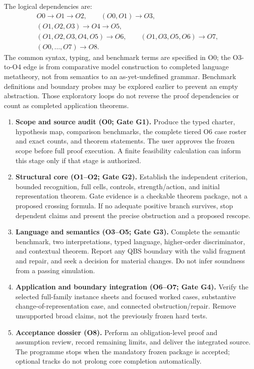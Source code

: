 \documentclass[11pt,a4paper]{article}
\begin{document}
The logical dependencies are:
\[
 \begin{gathered}
 O0\longrightarrow O1\longrightarrow O2,\qquad
 (O0,O1)\longrightarrow O3,\\
 (O1,O2,O3)\longrightarrow O4\longrightarrow O5,\\
 (O1,O2,O3,O4,O5)\longrightarrow O6,\qquad
 (O1,O3,O5,O6)\longrightarrow O7,\\
 (O0,\ldots,O7)\longrightarrow O8.
 \end{gathered}
\]
The common syntax, typing, and benchmark terms are specified in O0; the
O3-to-O4 edge is from comparative model construction to completed language
metatheory, not from semantics to an as-yet-undefined grammar.
Benchmark definitions and boundary probes may be explored earlier to prevent
an empty abstraction. Those exploratory loops do not reverse the proof
dependencies or count as completed application theorems.

\begin{enumerate}[label=\textbf{Stage \arabic*.}]
\item \textbf{Scope and source audit (O0; Gate G1).}
Produce the typed charter, hypothesis map, comparison benchmarks, the complete
tiered O6 case roster and exact counts, and theorem statements. The user
approves the frozen scope before
full proof execution. A finite feasibility calculation can inform this
stage only if that stage is authorized.
\item \textbf{Structural core (O1--O2; Gate G2).}
Establish the independent criterion, bounded recognition, full cells,
controls, strength/action, and initial representation theorem. Gate evidence
is a checkable theorem package, not a proposed crossing formula. If no
adequate positive branch survives, stop dependent claims and present the
precise obstruction and a proposed rescope.
\item \textbf{Language and semantics (O3--O5; Gate G3).}
Complete the semantic benchmark, two interpretations, typed language,
higher-order discriminator, and contextual theorem. Report any QBS boundary
with the valid fragment and repair, and seek a decision for material changes.
Do not infer soundness from a passing simulation.
\item \textbf{Application and boundary integration (O6--O7; Gate G4).}
Verify the selected full-family instance sheets and focused worked cases,
substantive change-of-representation case, and connected obstruction/repair.
Remove unsupported broad claims,
not the previously frozen hard tests.
\item \textbf{Acceptance dossier (O8).}
Perform an obligation-level proof and assumption review, record remaining
limits, and deliver the integrated source. The programme stops when the
mandatory frozen package is accepted; optional tracks do not prolong core
completion automatically.
\end{enumerate}
\end{document}
